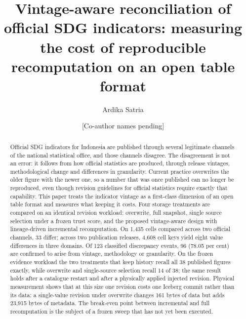 \documentclass[a4paper,fleqn]{cas-dc}
\begin{document}
\let\WriteBookmarks\relax
\def\floatpagepagefraction{1}
\def\textpagefraction{.001}


\title[mode = title]{Vintage-aware reconciliation of official SDG indicators:
measuring the cost of reproducible recomputation on an open table format}

\author[1]{Ardika Satria}
\cormark[1]


\author[1]{[Co-author names pending]}


\begin{abstract}
Official SDG indicators for Indonesia are published through several legitimate
channels of the national statistical office, and those channels disagree. The
disagreement is not an error: it follows from how official statistics are
produced, through release vintages, methodological change and differences in
granularity. Current practice overwrites the older figure with the newer one, so
a number that was once published can no longer be reproduced, even though
revision guidelines for official statistics require exactly that capability.
This paper treats the indicator vintage as a first-class dimension of an open
table format and measures what keeping it costs. Four storage treatments are
compared on an identical revision workload: overwrite, full snapshot, single
source selection under a frozen trust score, and the proposed vintage-aware
design with lineage-driven incremental recomputation. On 1,435 cells compared
across two official channels, 33 differ; across two publication releases, 4,608
cell keys yield eight value differences in three domains. Of 123 classified
discrepancy events, 96 (78.05 per cent) are confirmed to arise from vintage,
methodology or granularity. On the frozen evidence workload the two treatments
that keep history recall all 38 published figures exactly, while overwrite and
single-source selection recall 14 of 38; the same result holds after a catalogue
restart and after a physically applied injected revision. Physical measurement
shows that at this size one revision costs one Iceberg commit rather than its
data: a single-value revision under overwrite changes 161 bytes of data but adds
23,915 bytes of metadata. The break-even point between incremental and full
recomputation is the subject of a frozen sweep that has not yet been executed.
\end{abstract}
\end{document}
